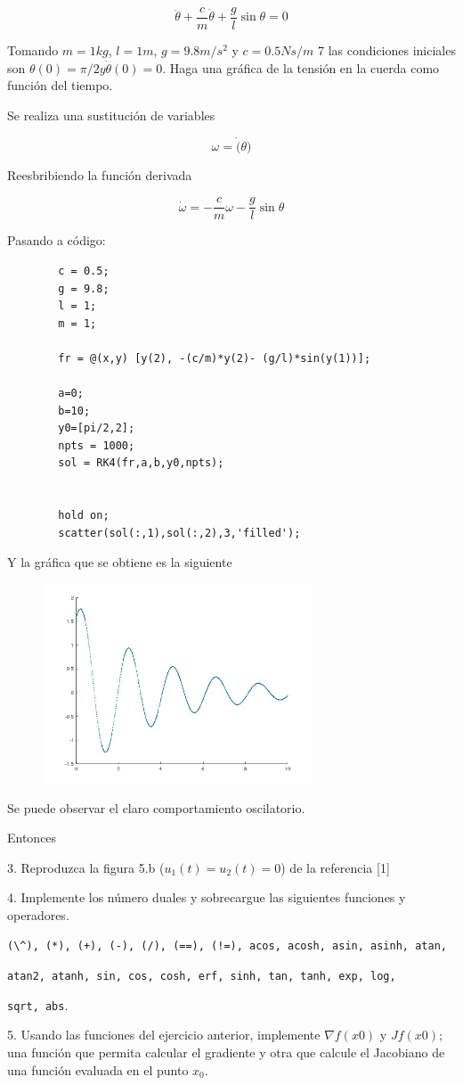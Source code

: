 \documentclass[a4paper, 12pt]{article}
\begin{document}
    \[
        \ddot{\theta} + \frac{c}{m} \dot{\theta} + \frac{g}{l} \sin \theta = 0  
    \]

    Tomando $m=1 kg$, $l=1m$, $g=9.8m/s^2$ y $c=0.5 Ns/m$ 7 las condiciones iniciales son $\theta(0) = \pi/2 y \dot{\theta}(0) = 0$. Haga una gráfica de la tensión en la cuerda como función del tiempo.

    Se realiza una sustitución de variables

    \[
        \omega = \dot(\theta)
    \]

    Reesbribiendo la función derivada

    \[
        \dot{\omega} = -\frac{c}{m}\omega - \frac{g}{l} \sin \theta
    \]

    Pasando a código:

    \begin{verbatim}
        c = 0.5;
        g = 9.8;
        l = 1;
        m = 1;

        fr = @(x,y) [y(2), -(c/m)*y(2)- (g/l)*sin(y(1))];

        a=0;
        b=10;
        y0=[pi/2,2];
        npts = 1000;
        sol = RK4(fr,a,b,y0,npts);


        hold on;
        scatter(sol(:,1),sol(:,2),3,'filled');
    \end{verbatim}

    Y la gráfica que se obtiene es la siguiente

    \begin{figure}[ht!]
        \centering
        \includegraphics[width=8cm]{img/e2.jpeg}
    \end{figure}

    Se puede observar el claro comportamiento oscilatorio.


    Entonces

    3. Reproduzca la figura 5.b ($u_1(t) = u_2(t) = 0$) de la referencia [1]

    4. Implemente los número duales y sobrecargue las siguientes funciones y operadores.

    \verb|(\^), (*), (+), (-), (/), (==), (!=), acos, acosh, asin, asinh, atan,|
    
    \verb|atan2, atanh, sin, cos, cosh, erf, sinh, tan, tanh, exp, log,|
    
    \verb|sqrt, abs|.

    5. Usando las funciones del ejercicio anterior, implemente $\nabla f(x0)$ y $Jf(x0)$; una función que permita calcular el gradiente y otra que calcule el Jacobiano de una función evaluada en el punto $x_0$.
    
\end{document}
